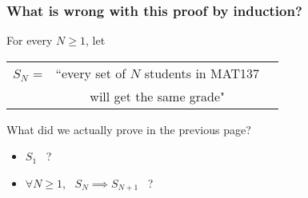 \documentclass[14pt]{beamer}
\begin{document}
	\begin{frame}
		\frametitle{What is wrong with this proof by induction?}

		For every $N \geq 1$, let
		\begin{center}
			\begin{tabular}{rcc}
				$\displaystyle S_{N}$ = & ``every set of $N$ students in MAT137 \\
				                        & will get the same grade"
			\end{tabular}
		\end{center}

		\vfill

		What did we actually prove in the previous page?

		\begin{itemize}
			\item $S_{1}$ \, ?

			\item $\displaystyle \forall N \geq 1$, \,
				$\displaystyle S_{N}\implies S_{N+1}$ \, ?
		\end{itemize}

		\vfill
	\end{frame}



\end{document}
